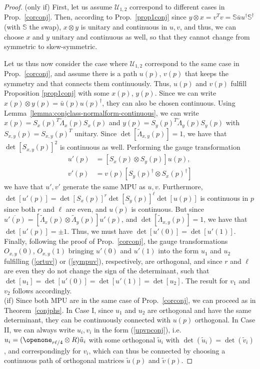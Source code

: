 \documentclass[pra,twocolumn,nofootinbib,superscriptaddress]{revtex4-1}
\begin{document}
\begin{proof}
	(only if)
	First, let us assume $\mathcal U_{1,2}$ correspond to different cases in
	Prop.~\ref{corconj}.  Then, according to  Prop.~\ref{prop1conj} since
	$y\otimes x=v^T v=\mathbb S\bar u u^\dagger \mathbb{S}^\dagger$ (with
	$\mathbb S$ the swap), $x\otimes y$ is unitary and continuous in $u,v$,
	and thus, we can choose $x$ and $y$ unitary and continuous as well, so
	that they cannot change from symmetric to skew-symmetric.

	Let us thus now consider the case where $\mathcal U_{1,2}$ correspond to
	the same case in Prop.~\ref{corconj}, and assume there is a path $u(p)$,
	$v(p)$ that keeps the symmetry and that connects them continuously. Thus,
	$u(p)$ and $v(p)$ fulfill Proposition \ref{prop1conj} with some $x(p)$,
	$y(p)$. Since we can
	write $x(p)\otimes y(p)=\bar u(p)u(p)^\dagger$, they can also be chosen
	continuous.
	Using Lemma~\ref{lemma:conjclass-normalform-continuous},
	we can write $x(p)=S_x(p)^T \tilde \Lambda_x(p) S_x(p)$ and $y(p)=S_y(p)^T
		\tilde \Lambda_y(p) S_y(p)$ with $S_{x,y}(p)=S_{x,y}(p)^T$ unitary.  Since
	$\det[\tilde\Lambda_{x,y}(p)]=1$, we have that
	$\det[S_{x,y}(p)]^2$ is continuous as well.
	Performing the gauge transformation
	\begin{align*}
		u'(p) & =[S_x(p)\otimes S_y(p)]u(p),                \\
		v'(p) & =v(p)[S_y(p)^\dagger\otimes S_x(p)^\dagger]
	\end{align*}
	we have that $u',v'$ generate the same MPU as $u,v$. Furthermore,
	$\det[u'(p)]=\det[S_x(p)]^r \det[S_y(p)]^\ell \det[u(p)]$ is continuous
	in $p$ since both $r$ and $\ell$ are even, and $u(p)$ is continuous.
	But since $\overline{u'(p)}=[\tilde \Lambda_x(p)\otimes \tilde
		\Lambda_y(p)] u'(p)$,  and $\det[\tilde\Lambda_{x,y}(p)]
		=1$, we have that $\det[u'(p)]=\pm 1$. Thus, we must have
	$\det[u'(0)]=\det[u'(1)]$. Finally, following the proof of
	Prop.~\ref{corconj}, the gauge transformations $O_{x,y}(0)$,
	$O_{x,y}(1)$ bringing $u'(0)$ and $u'(1)$ into the form
	$u_1$ and $u_2$ fulfilling (\ref{ortuv}) or (\ref{sympuv}),
	respectively,
	are orthogonal, and since $r$ and $\ell$ are even they
	do not change the sign of the determinant, such that
	$\det[u_1]=\det[u'(0)]=\det[u'(1)]=\det[u_2]$. The result for $v_1$ and
	$v_2$ follows accordingly.
	\\[0.5ex]
	(if) Since both MPU are in the same case of Prop.~\ref{corconj}, we can
	proceed as in Theorem~\ref{conjphs}. In Case I, since $u_1$ and $u_2$
	are orthogonal and have the same determinant, they can be continuously
	connected with $u(p)$ orthogonal. In Case II, we can always write
	$u_{i},v_{i}$ in the form (\ref{upvpconj}), i.e.\ $u_i =
		(\openone_{r\ell/4}\otimes R)\tilde u_i$ with some orthogonal $\tilde u_i$
	with $\det(\tilde u_i)=\det(\tilde v_i)$, and correspondingly for $v_i$,
	which can thus be connected by choosing a continuous path of orthogonal
	matrices $\tilde u(p)$ and $\tilde v(p)$.
\end{proof}
\end{document}
